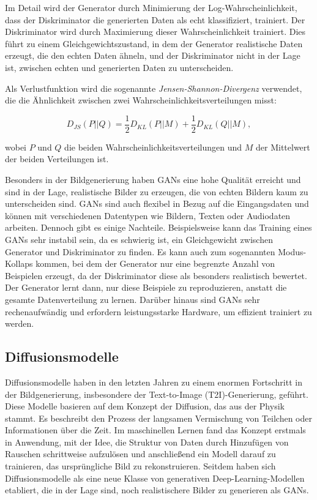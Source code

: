 Im Detail wird der Generator durch Minimierung der Log-Wahrscheinlichkeit, dass der Diskriminator die generierten Daten als echt klassifiziert, trainiert. Der Diskriminator wird durch Maximierung dieser Wahrscheinlichkeit trainiert. Dies führt zu einem Gleichgewichtszustand, in dem der Generator realistische Daten erzeugt, die den echten Daten ähneln, und der Diskriminator nicht in der Lage ist, zwischen echten und generierten Daten zu unterscheiden.

Als Verlustfunktion wird die sogenannte \textit{Jensen-Shannon-Divergenz} verwendet, die die Ähnlichkeit zwischen zwei Wahrscheinlichkeitsverteilungen misst:

\begin{equation}
	D_{JS}(P||Q) = \frac{1}{2} D_{KL}(P||M) + \frac{1}{2} D_{KL}(Q||M),
	\label{eq:js-divergence}
\end{equation}

wobei $P$ und $Q$ die beiden Wahrscheinlichkeitsverteilungen und $M$ der Mittelwert der beiden Verteilungen ist.

Besonders in der Bildgenerierung haben GANs eine hohe Qualität erreicht und sind in der Lage, realistische Bilder zu erzeugen, die von echten Bildern kaum zu unterscheiden sind. GANs sind auch flexibel in Bezug auf die Eingangsdaten und können mit verschiedenen Datentypen wie Bildern, Texten oder Audiodaten arbeiten. Dennoch gibt es einige Nachteile. Beispielsweise kann das Training eines GANs sehr instabil sein, da es schwierig ist, ein Gleichgewicht zwischen Generator und Diskriminator zu finden. Es kann auch zum sogenannten Modus-Kollaps kommen, bei dem der Generator nur eine begrenzte Anzahl von Beispielen erzeugt, da der Diskriminator diese als besonders realistisch bewertet. Der Generator lernt dann, nur diese Beispiele zu reproduzieren, anstatt die gesamte Datenverteilung zu lernen. Darüber hinaus sind GANs sehr rechenaufwändig und erfordern leistungsstarke Hardware, um effizient trainiert zu werden.

\subsection{Diffusionsmodelle} \label{sec:diffusion-models}

Diffusionsmodelle haben in den letzten Jahren zu einem enormen Fortschritt in der Bildgenerierung, insbesondere der Text-to-Image (T2I)-Generierung, geführt. Diese Modelle basieren auf dem Konzept der Diffusion, das aus der Physik stammt. Es beschreibt den Prozess der langsamen Vermischung von Teilchen oder Informationen über die Zeit. Im maschinellen Lernen fand das Konzept erstmals in \parencite{SohlDickstein2015diffusionmodels} Anwendung, mit der Idee, die Struktur von Daten durch Hinzufügen von Rauschen schrittweise aufzulösen und anschließend ein Modell darauf zu trainieren, das ursprüngliche Bild zu rekonstruieren. Seitdem haben sich Diffusionsmodelle als eine neue Klasse von generativen Deep-Learning-Modellen etabliert, die in der Lage sind, noch realistischere Bilder zu generieren als GANs.

